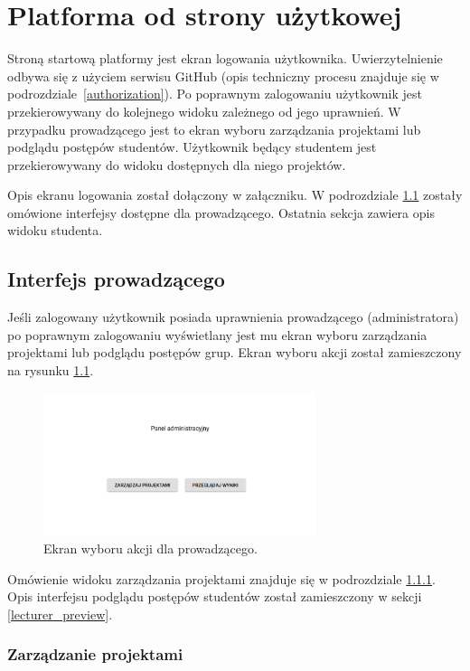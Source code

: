 \chapter{Platforma od strony użytkowej}
\label{chapter:interfaces}

Stroną startową platformy jest ekran logowania użytkownika.
Uwierzytelnienie odbywa się z użyciem serwisu GitHub (opis techniczny procesu znajduje się w podrozdziale~\ref{authorization}).
Po poprawnym zalogowaniu użytkownik jest przekierowywany do kolejnego widoku zależnego od jego uprawnień.
W przypadku prowadzącego jest to ekran wyboru zarządzania projektami lub podglądu postępów studentów.
Użytkownik będący studentem jest przekierowywany do widoku dostępnych dla niego projektów.

Opis ekranu logowania został dołączony w załączniku.
W podrozdziale \ref{lecturer_ui} zostały omówione interfejsy dostępne dla prowadzącego.
Ostatnia sekcja zawiera opis widoku studenta.


\section{Interfejs prowadzącego}
\label{lecturer_ui}

Jeśli zalogowany użytkownik posiada uprawnienia prowadzącego (administratora) po poprawnym zalogowaniu wyświetlany jest mu ekran wyboru zarządzania projektami lub podglądu postępów grup.
Ekran wyboru akcji został zamieszczony na rysunku \ref{fig:lecturer_actions}.

\begin{figure}[h]
    \centering
    \includegraphics[width = 8cm]{chapter04/lecturer_actions.png}
    \caption{Ekran wyboru akcji dla prowadzącego.}
    \label{fig:lecturer_actions}
\end{figure}

Omówienie widoku zarządzania projektami znajduje się w podrozdziale \ref{lecturer-management}.
Opis interfejsu podglądu postępów studentów został zamieszczony w sekcji \ref{lecturer_preview}.

\subsection{Zarządzanie projektami}
\label{lecturer-management}

